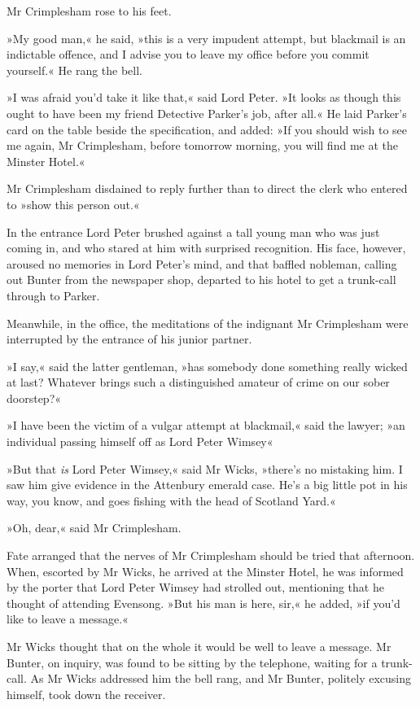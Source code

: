 Mr Crimplesham rose to his feet.

»My good man,« he said, »this is a very impudent attempt, but blackmail is an indictable offence, and I advise you to leave my office before you commit yourself.« He rang the bell.

»I was afraid you'd take it like that,« said Lord Peter. »It looks as though this ought to have been my friend Detective Parker's job, after all.« He laid Parker's card on the table beside the specification, and added: »If you should wish to see me again, Mr Crimplesham, before tomorrow morning, you will find me at the Minster Hotel.«

Mr Crimplesham disdained to reply further than to direct the clerk who entered to »show this person out.«

In the entrance Lord Peter brushed against a tall young man who was just coming in, and who stared at him with surprised recognition. His face, however, aroused no memories in Lord Peter's mind, and that baffled nobleman, calling out Bunter from the newspaper shop, departed to his hotel to get a trunk-call through to Parker.

Meanwhile, in the office, the meditations of the indignant Mr Crimplesham were interrupted by the entrance of his junior partner.

»I say,« said the latter gentleman, »has somebody done something really wicked at last? Whatever brings such a distinguished amateur of crime on our sober doorstep?«

»I have been the victim of a vulgar attempt at blackmail,« said the lawyer; »an individual passing himself off as Lord Peter Wimsey\longdash«

»But that \textit{is} Lord Peter Wimsey,« said Mr Wicks, »there's no mistaking him. I saw him give evidence in the Attenbury emerald case. He's a big little pot in his way, you know, and goes fishing with the head of Scotland Yard.«

»Oh, dear,« said Mr Crimplesham.

Fate arranged that the nerves of Mr Crimplesham should be tried that afternoon. When, escorted by Mr Wicks, he arrived at the Minster Hotel, he was informed by the porter that Lord Peter Wimsey had strolled out, mentioning that he thought of attending Evensong. »But his man is here, sir,« he added, »if you'd like to leave a message.«

Mr Wicks thought that on the whole it would be well to leave a message. Mr Bunter, on inquiry, was found to be sitting by the telephone, waiting for a trunk-call. As Mr Wicks addressed him the bell rang, and Mr Bunter, politely excusing himself, took down the receiver.

